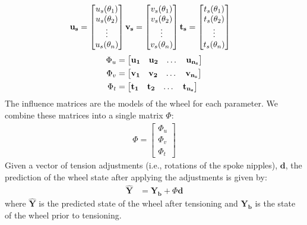 \documentclass[journal]{IEEEtran}
\begin{document}
\begin{align*}
    \bf u_s &=  \begin{bmatrix}
        u_s(\theta_1)\\
        u_s(\theta_2)\\
        \vdots\\
        u_s(\theta_n)
        \end{bmatrix}
    \bf v_s = \begin{bmatrix}
        v_s(\theta_1)\\
        v_s(\theta_2)\\
        \vdots\\
        v_s(\theta_n)
    \end{bmatrix}
        \bf t_s = \begin{bmatrix}
        t_s(\theta_1)\\
        t_s(\theta_2)\\
        \vdots\\
        t_s(\theta_n)
    \end{bmatrix}
    \end{align*}
    \begin{align*}
     \Phi_u &= \begin{bmatrix}
     \bf u_1 & \bf u_2& \dots & \bf u_{n_s}
     \end{bmatrix}\\
     \Phi_v &= \begin{bmatrix}
     \bf v_1 & \bf v_2& \dots & \bf v_{n_s}
     \end{bmatrix}\\     
     \Phi_t &= \begin{bmatrix}
     \bf t_1 & \bf t_2& \dots & \bf t_{n_s}
     \end{bmatrix} 
\end{align*}
 The influence matrices are the models of the wheel for each parameter.  We combine these matrices into a single matrix $\Phi$:
 \begin{align}
 \Phi = 
     \begin{bmatrix}
         \Phi_u\\
         \Phi_v\\
         \Phi_t
     \end{bmatrix}
     \label{eq:phi}
 \end{align}
Given a vector of tension adjustments (i.e., rotations of the spoke nipples), $\mathbf d$, the prediction of the wheel state after applying the adjustments is given by:
\begin{align}
\mathbf{\hat Y} &= 
     \mathbf{Y_b} + \Phi  \mathbf{d} 
     \label{eq:Y_hat}
 \end{align}
where $\mathbf{\hat Y}$ is the predicted state of the wheel after tensioning and $\mathbf{Y_b}$ is the state of the wheel prior to tensioning. 
\end{document}
